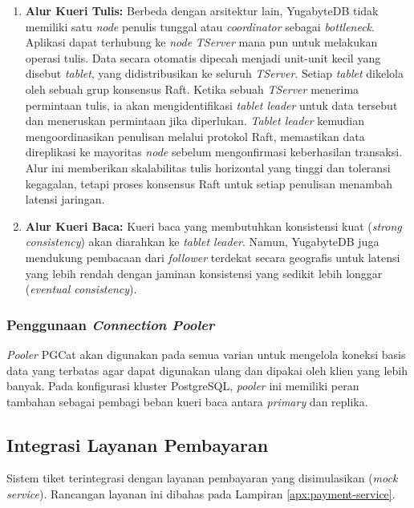 \begin{enumerate}
    \item \textbf{Alur Kueri Tulis:} Berbeda dengan arsitektur lain, YugabyteDB tidak memiliki satu \textit{node} penulis tunggal atau \textit{coordinator} sebagai \textit{bottleneck}. Aplikasi dapat terhubung ke \textit{node} \textit{TServer} mana pun untuk melakukan operasi tulis. Data secara otomatis dipecah menjadi unit-unit kecil yang disebut \textit{tablet}, yang didistribusikan ke seluruh \textit{TServer}. Setiap \textit{tablet} dikelola oleh sebuah grup konsensus Raft. Ketika sebuah \textit{TServer} menerima permintaan tulis, ia akan mengidentifikasi \textit{tablet leader} untuk data tersebut dan meneruskan permintaan jika diperlukan. \textit{Tablet leader} kemudian mengoordinasikan penulisan melalui protokol Raft, memastikan data direplikasi ke mayoritas \textit{node} sebelum mengonfirmasi keberhasilan transaksi. Alur ini memberikan skalabilitas tulis horizontal yang tinggi dan toleransi kegagalan, tetapi proses konsensus Raft untuk setiap penulisan menambah latensi jaringan.
    \item \textbf{Alur Kueri Baca:} Kueri baca yang membutuhkan konsistensi kuat (\textit{strong consistency}) akan diarahkan ke \textit{tablet leader}. Namun, YugabyteDB juga mendukung pembacaan dari \textit{follower} terdekat secara geografis untuk latensi yang lebih rendah dengan jaminan konsistensi yang sedikit lebih longgar (\textit{eventual consistency}).
\end{enumerate}

\subsubsection{Penggunaan \textit{Connection Pooler}}

\textit{Pooler} PGCat akan digunakan pada semua varian untuk mengelola koneksi basis data yang terbatas agar dapat digunakan ulang dan dipakai oleh klien yang lebih banyak. Pada konfigurasi kluster PostgreSQL, \textit{pooler} ini memiliki peran tambahan sebagai pembagi beban kueri baca antara \textit{primary} dan replika.

\subsection{Integrasi Layanan Pembayaran}

Sistem tiket terintegrasi dengan layanan pembayaran yang disimulasikan (\textit{mock service}). Rancangan layanan ini dibahas pada Lampiran \ref{apx:payment-service}.

